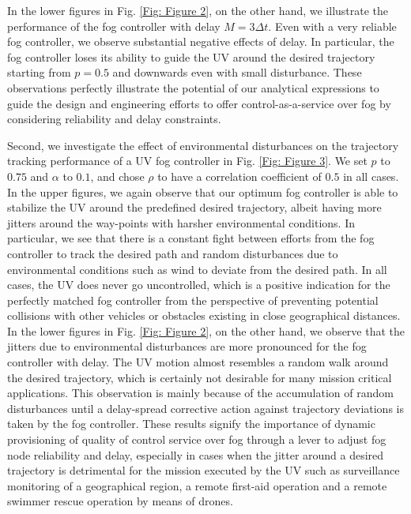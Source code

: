 \documentclass[10pt, journal, letterpaper]{IEEEtran}
\newcommand{\1}{\ensuremath{\mathbf{1}}} %
\begin{document}
In the lower figures in Fig. \ref{Fig: Figure 2}, on the other hand, we illustrate the performance of the fog controller with delay $M = 3 \Delta t$.  Even with a very reliable fog controller, we observe substantial negative effects of delay.  In particular, the fog controller loses its ability to guide the UV around the desired trajectory starting from $p=0.5$ and downwards even with small disturbance.  These observations perfectly illustrate the potential of our analytical expressions to guide the design and engineering efforts to offer control-as-a-service over fog by considering reliability and delay constraints.

Second, we investigate the effect of environmental disturbances on the trajectory tracking performance of a UV fog controller in Fig. \ref{Fig: Figure 3}.  We set $p$ to $0.75$ and $\alpha$ to $0.1$, and chose $\rho$ to have a correlation coefficient of $0.5$ in all cases.  In the upper figures, we again observe that our optimum fog controller is able to stabilize the UV around the predefined desired trajectory, albeit having more jitters around the way-points with harsher environmental conditions. In particular, we see that there is a constant fight between efforts from the fog controller to track the desired path and random disturbances due to environmental conditions such as wind to deviate from the desired path.  In all cases, the UV does never go uncontrolled, which is a positive indication for the perfectly matched fog controller from the perspective of preventing potential collisions with other vehicles or obstacles existing in close geographical distances.  In the lower figures in Fig. \ref{Fig: Figure 2}, on the other hand, we observe that the jitters due to environmental disturbances are more pronounced for the fog controller with delay.  The UV motion almost resembles a random walk around the desired trajectory, which is certainly not desirable for many mission critical applications.  This observation is mainly because of the accumulation of random disturbances until a delay-spread corrective action against trajectory deviations is taken by the fog controller.  These results signify the importance of dynamic provisioning of quality of control service over fog through a lever to adjust fog node reliability and delay, especially in cases when the jitter around a desired trajectory is detrimental for the mission executed by the UV such as surveillance monitoring of a geographical region, a remote first-aid operation and a remote swimmer rescue operation by means of drones.
\end{document}
